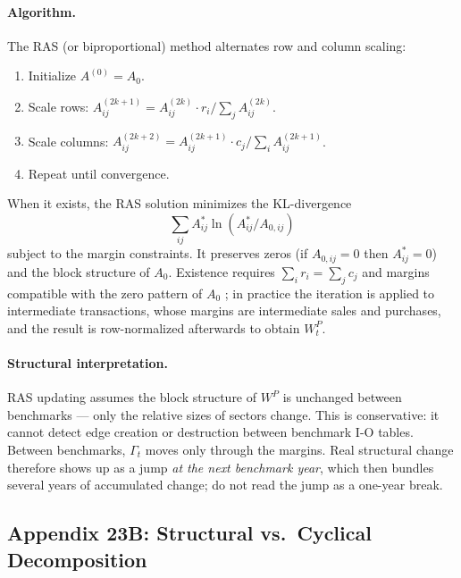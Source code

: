 \documentclass[../structural_economics_book.tex]{subfiles}
\begin{document}
\paragraph{Algorithm.} The RAS (or biproportional) method alternates row and column scaling:
\begin{enumerate}
\item Initialize $A^{(0)} = A_0$.
\item Scale rows: $A^{(2k+1)}_{ij} = A^{(2k)}_{ij} \cdot r_i / \sum_j A^{(2k)}_{ij}$.
\item Scale columns: $A^{(2k+2)}_{ij} = A^{(2k+1)}_{ij} \cdot c_j / \sum_i A^{(2k+1)}_{ij}$.
\item Repeat until convergence.
\end{enumerate}

When it exists, the RAS solution minimizes the KL-divergence
\[
\textstyle\sum_{ij} A^*_{ij}\ln(A^*_{ij}/A_{0,ij})
\]
subject to the margin constraints. It preserves zeros (if $A_{0,ij} = 0$ then $A^*_{ij} = 0$) and the block structure of $A_0$. Existence requires $\sum_i r_i = \sum_j c_j$ and margins compatible with the zero pattern of $A_0$ \citep{bacharach1970biproportional}; in practice the iteration is applied to intermediate transactions, whose margins are intermediate sales and purchases, and the result is row-normalized afterwards to obtain $W^P_t$.

\paragraph{Structural interpretation.} RAS updating assumes the block structure of $W^P$ is unchanged between benchmarks --- only the relative sizes of sectors change. This is conservative: it cannot detect edge creation or destruction between benchmark I-O tables. Between benchmarks, $\Gamma_t$ moves only through the margins. Real structural change therefore shows up as a jump \emph{at the next benchmark year}, which then bundles several years of accumulated change; do not read the jump as a one-year break.


\subsection*{Appendix 23B: Structural vs.\ Cyclical Decomposition}
\label{ch23:app:decomposition}
\end{document}
